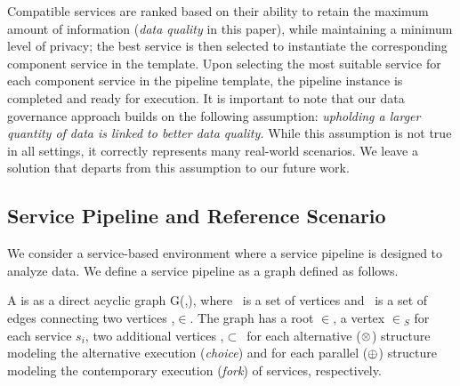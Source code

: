Compatible services are ranked based on their ability to retain the maximum amount of information (\emph{data quality} in this paper), while maintaining a minimum level of privacy; the best service is then selected to instantiate the corresponding component service in the template.
Upon selecting the most suitable service for each component service in the pipeline template, the pipeline instance is completed and ready for execution.
It is important to note that our data governance approach builds on the following assumption: \emph{upholding a larger quantity of data is linked to better data quality.}
While this assumption is not true in all settings, it correctly represents many real-world scenarios. We leave a solution that departs from this assumption to our future work.

\subsection{Service Pipeline and Reference Scenario}\label{sec:service_definition}
We consider a service-based environment where a service pipeline is designed to analyze data.
We define a service pipeline as a graph defined as follows. %
\begin{definition}[\pipeline]\label{def:pipeline}
  A \pipeline is as a direct acyclic graph G(\V,\E), where \V\ is a set of vertices and \E\ is a set of edges connecting two vertices ,$\in$\V.
  The graph has a root $\in$\V, a vertex $\in$\V$_S$ for each service $s_i$, two additional vertices ,$\subset$\V\ for each alternative ($\otimes$) structure modeling the alternative execution (\emph{choice}) and for each parallel ($\oplus$) structure modeling the contemporary execution (\emph{fork}) of services, respectively.
\end{definition}

